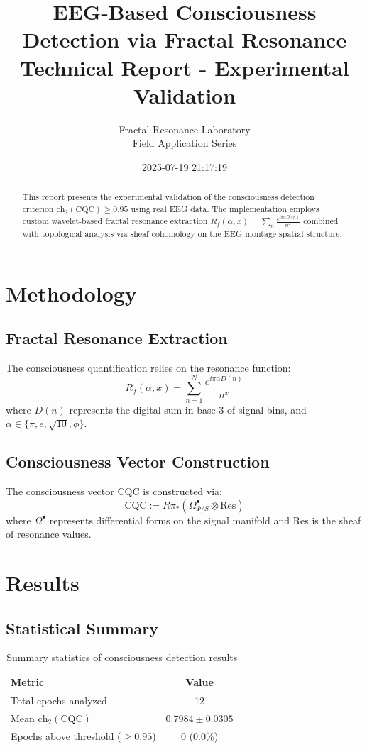 \documentclass[11pt,a4paper]{article}
\title{EEG-Based Consciousness Detection via Fractal Resonance\\
\large Technical Report - Experimental Validation}
\author{Fractal Resonance Laboratory\\Field Application Series}
\date{2025-07-19 21:17:19}
\begin{document}
\maketitle

\begin{abstract}
This report presents the experimental validation of the consciousness detection criterion $\text{ch}_2(\text{CQC}) \geq 0.95$ 
using real EEG data. The implementation employs custom wavelet-based fractal resonance extraction 
$R_f(\alpha, x) = \sum_n \frac{e^{i\pi\alpha D(n)}}{n^x}$ combined with topological analysis 
via sheaf cohomology on the EEG montage spatial structure.
\end{abstract}

\section{Methodology}
\subsection{Fractal Resonance Extraction}
The consciousness quantification relies on the resonance function:
\begin{equation}
R_f(\alpha, x) = \sum_{n=1}^{N} \frac{e^{i\pi\alpha D(n)}}{n^x}
\end{equation}
where $D(n)$ represents the digital sum in base-3 of signal bins, and $\alpha \in \{\pi, e, \sqrt{10}, \phi\}$.

\subsection{Consciousness Vector Construction}
The consciousness vector CQC is constructed via:
\begin{equation}
\text{CQC} := R\pi_*(\Omega^\bullet_{\Phi/S} \otimes \text{Res})
\end{equation}
where $\Omega^\bullet$ represents differential forms on the signal manifold and Res is the sheaf of resonance values.

\section{Results}

\subsection{Statistical Summary}
\begin{table}[H]
\centering
\begin{tabular}{@{}lc@{}}
\toprule
Metric & Value \\
\midrule
Total epochs analyzed & 12 \\
Mean $\text{ch}_2(\text{CQC})$ & $0.7984 \pm 0.0305$ \\
Epochs above threshold ($\geq 0.95$) & 0 (0.0\%) \\
\bottomrule
\end{tabular}
\caption{Summary statistics of consciousness detection results}
\end{table}
\end{document}
